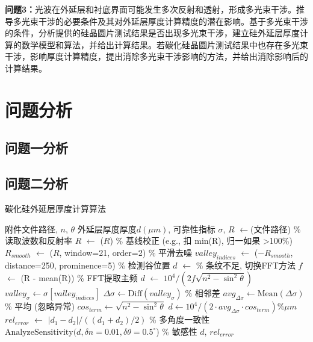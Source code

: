 \documentclass[withoutpreface,bwprint]{cumcmthesis} %
\begin{document}
\textbf{问题3：}光波在外延层和衬底界面可能发生多次反射和透射，形成多光束干涉。推导多光束干涉的必要条件及其对外延层厚度计算精度的潜在影响。基于多光束干涉的条件，分析提供的硅晶圆片测试结果是否出现多光束干涉，建立硅外延层厚度计算的数学模型和算法，并给出计算结果。若碳化硅晶圆片测试结果中也存在多光束干涉，影响厚度计算精度，提出消除多光束干涉影响的方法，并给出消除影响后的计算结果。


\section{问题分析}

\subsection{问题一分析}

\subsection{问题二分析}
\begin{algorithm}
\caption{碳化硅外延层厚度计算算法}
\begin{algorithmic}[1]
\REQUIRE 附件文件路径, $n$, $\theta$
\ENSURE 外延层厚度厚度$d(\mu m)$, 可靠性指标
\STATE $\sigma$, $R$ $\gets $(文件路径)   \% 读取波数和反射率
\STATE $R$ $\gets$ ($R$)  \% 基线校正 (e.g., 扣 min(R), 归一如果 >100\%)
\STATE $R_{smooth}$ $\gets$ ($R$, window=21, order=2)  \% 平滑去噪
\STATE $valley_{indices}$ $\gets$ ($-R_{smooth}$, distance=250, prominence=5)  \% 检测谷位置
    \STATE $d$ $\gets$   \% 条纹不足, 切换FFT方法
    \STATE $f$ $\gets$ (R - mean(R))  \% FFT提取主频
    \STATE $d$ $\gets$ $10^4 / (2 f \sqrt{n^2 - \sin^2 \theta})$
\ELSE
    \STATE $valley_{\sigma} \gets \sigma[valley_{indices}]$
    \STATE $\Delta\sigma \gets \text{Diff}(valley_{\sigma})$  \% 相邻差
    \STATE $avg_{\Delta\sigma} \gets \text{Mean}(\Delta\sigma) $ \% 平均 (忽略异常)
    \STATE $cos_{term} \gets \sqrt{n^2 - \sin^2 \theta}$
    \STATE $d \gets 10^4 / (2 \cdot avg_{\Delta\sigma} \cdot cos_{term})  \% \mu m$
\ENDIF
\STATE $rel_{error}$ $\gets$ $|d_1 - d_2| / ((d_1 + d_2)/2)$  \% 多角度一致性
\STATE $\text{AnalyzeSensitivity}(d, \delta n=0.01, \delta \theta=0.5^\circ$)  \% 敏感性
\RETURN $d$, $rel_{error}$
\end{algorithmic}
\end{algorithm}
\end{document}
